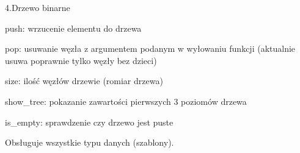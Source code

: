 4.\+Drzewo binarne


\begin{DoxyItemize}
\item push\+: wrzucenie elementu do drzewa
\item pop\+: usuwanie węzła z argumentem podanym w wyłowaniu funkcji (aktualnie usuwa poprawnie tylko węzły bez dzieci)
\item size\+: ilość węzłów drzewie (romiar drzewa)
\item show\+\_\+tree\+: pokazanie zawartości pierwszych 3 poziomów drzewa
\item is\+\_\+empty\+: sprawdzenie czy drzewo jest puste
\end{DoxyItemize}

Obsługuje wszystkie typu danych (szablony). 